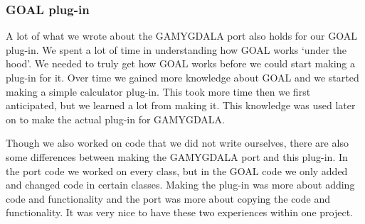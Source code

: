 \subsubsection{GOAL plug-in}
A lot of what we wrote about the GAMYGDALA port also holds for our GOAL plug-in. We spent a lot of time in understanding how GOAL works `under the hood'. We needed to truly get how GOAL works before we could start making a plug-in for it. Over time we gained more knowledge about GOAL and we started making a simple calculator plug-in. This took more time then we first anticipated, but we learned a lot from making it. This knowledge was used later on to make the actual plug-in for GAMYGDALA. \par
Though we also worked on code that we did not write ourselves, there are also some differences between making the GAMYGDALA port and this plug-in. In the port code we worked on every class, but in the GOAL code we only added and changed code in certain classes. Making the plug-in was more about adding code and functionality and the port was more about copying the code and functionality. It was very nice to have these two experiences within one project.

